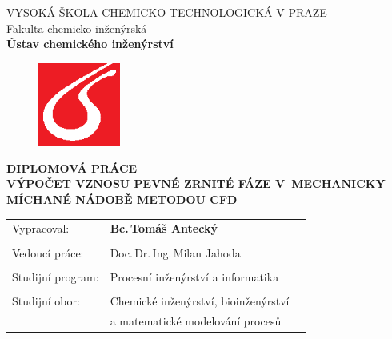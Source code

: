\begin{center}
{\Large VYSOKÁ ŠKOLA CHEMICKO-TECHNOLOGICKÁ V PRAZE\\}
{\large Fakulta chemicko-inženýrská\\
\textbf{Ústav chemického inženýrství}\\}
\vspace{15mm}

\begin{figure}[h!]
\centering
\includegraphics[angle=0,width=27mm]{images/logo_vscht.eps}
\end{figure}

\vspace{29mm}

{\huge \textbf{DIPLOMOVÁ PRÁCE\\}}
\vspace{10mm}
{\large \textbf{VÝPOČET VZNOSU PEVNÉ ZRNITÉ FÁZE V~MECHANICKY MÍCHANÉ NÁDOBĚ METODOU CFD\\}}
\end{center}
\vspace{25mm}

\begin{tabular}{p{50mm}lp{50mm}}
Vypracoval: & \textbf{Bc.\,Tomáš Antecký}\\
\\
Vedoucí práce: & Doc.\,Dr.\,Ing.\,Milan Jahoda \\

\\
Studijní program: & Procesní inženýrství a informatika \\
\\
Studijní obor: & Chemické inženýrství, bioinženýrství  \\
	& a matematické modelování procesů\\
\end{tabular}
